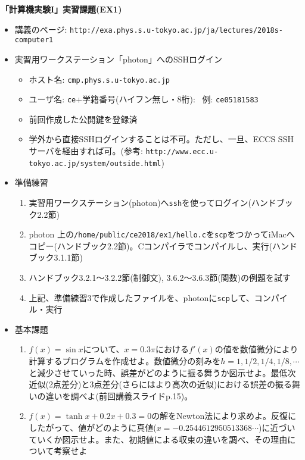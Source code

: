 \documentclass[11pt]{jarticle}
\begin{document}
\noindent
{\bf\large 「計算機実験I」実習課題(EX1)}
\\[-0.5em]

\noindent
\begin{itemize}
\item 講義のページ: \verb+http://exa.phys.s.u-tokyo.ac.jp/ja/lectures/2018s-computer1+

\item 実習用ワークステーション「photon」へのSSHログイン
  \begin{itemize}
  \item ホスト名: {\tt cmp.phys.s.u-tokyo.ac.jp}
  \item ユーザ名: {\tt ce}+学籍番号(ハイフン無し・8桁): \ 例: {\tt ce05181583}
  \item 前回作成した公開鍵を登録済
  \item 学外から直接SSHログインすることは不可。ただし、一旦、ECCS SSHサーバを経由すれば可。(参考: \verb+http://www.ecc.u-tokyo.ac.jp/system/outside.html+)
\end{itemize}
  
\item 準備練習
  \begin{enumerate}
  \item 実習用ワークステーション(photon)へ{\tt ssh}を使ってログイン(ハンドブック2.2節)
  \item photon 上の{\tt /home/public/ce2018/ex1/hello.c}を{\tt scp}をつかってiMacへコピー(ハンドブック2.2節)。Cコンパイラでコンパイルし、実行(ハンドブック3.1.1節)
  \item ハンドブック3.2.1〜3.2.2節(制御文), 3.6.2〜3.6.3節(関数)の例題を試す
  \item 上記、準備練習3で作成したファイルを、photonに{\tt scp}して、コンパイル・実行
  \end{enumerate}

\item 基本課題
  \begin{enumerate}
  \item $f(x)=\sin x$について、$x=0.3\pi$における$f'(x)$の値を数値微分により計算するプログラムを作成せよ。数値微分の刻みを$h=1,1/2,1/4,1/8,\cdots$と減少させていった時、誤差がどのように振る舞うか図示せよ。最低次近似(2点差分)と3点差分(さらにはより高次の近似)における誤差の振る舞いの違いを調べよ(前回講義スライドp.15)。
  \item $f(x)=\tanh x + 0.2 x + 0.3 = 0$の解をNewton法により求めよ。反復にしたがって、値がどのように真値($x=-0.2544612950513368\cdots$)に近づいていくか図示せよ。また、初期値による収束の違いを調べ、その理由について考察せよ
  \end{enumerate}
  

\end{itemize}
\end{document}
